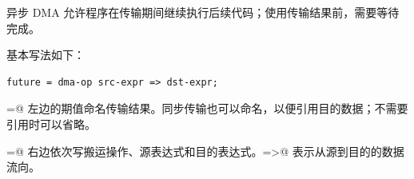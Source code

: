 异步 DMA 允许程序在传输期间继续执行后续代码；使用传输结果前，需要等待完成。

基本写法如下：

\begin{lstlisting}[language=croqtile,caption={基本语法}]
future = dma-op src-expr => dst-expr;
\end{lstlisting}

\co@=@ 左边的期值命名传输结果。同步传输也可以命名，以便引用目的数据；不需要引用时可以省略。

\co@=@ 右边依次写搬运操作、源表达式和目的表达式。\co@=>@ 表示从源到目的的数据流向。
